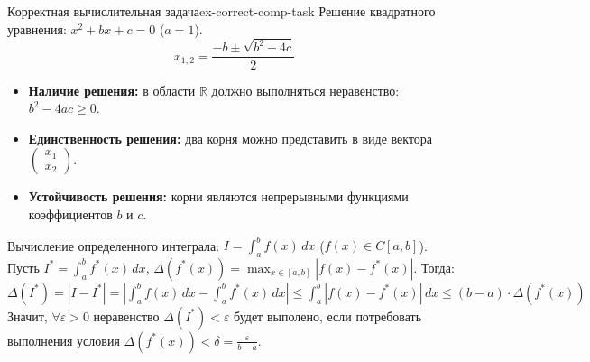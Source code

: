 \documentclass[14pt]{extarticle}
\begin{document}
    \begin{example}{Корректная вычислительная задача}{ex-correct-comp-task}
        Решение квадратного уравнения: $x^{2} + bx + c = 0$ ($a = 1$).
        $$x_{1, 2} = \frac{-b \pm \sqrt{b^{2} - 4c}}{2}$$
        \begin{itemize}
            \item \textbf{Наличие решения:} в области $\mathbb{R}$ должно выполняться неравенство: $b^{2} - 4ac \geq 0$.
            \item \textbf{Единственность решения:} два корня можно представить в виде вектора $\begin{pmatrix} x_{1} \\ x_{2} \end{pmatrix}$.
            \item \textbf{Устойчивость решения:} корни являются непрерывными функциями коэффициентов $b$ и $c$.
        \end{itemize}

        \vspace{\baselineskip}

        Вычисление определенного интеграла: $I = \int_{a}^{b} f(x) \, dx$ ($f(x) \in C[a, b]$).\\
        Пусть $I^{*} = \int_{a}^{b} f^{*}(x) \, dx$, $\Delta(f^{*}(x)) = \max_{x \in [a, b]}|f(x) - f^{*}(x)|$. Тогда:\\
        $\Delta(I^{*}) = |I - I^{*}| = |\int_{a}^{b} f(x) \, dx - \int_{a}^{b} f^{*}(x) \, dx| \leq \int_{a}^{b} |f(x) - f^{*}(x)| \, dx \leq (b - a) \cdot \Delta(f^{*}(x))$\\
        Значит, $\forall \varepsilon > 0$ неравенство $\Delta(I^{*}) < \varepsilon$ будет выполено, если потребовать выполнения условия $\Delta(f^{*}(x)) < \delta = \frac{\varepsilon}{b - a}$.
    \end{example}
\end{document}
